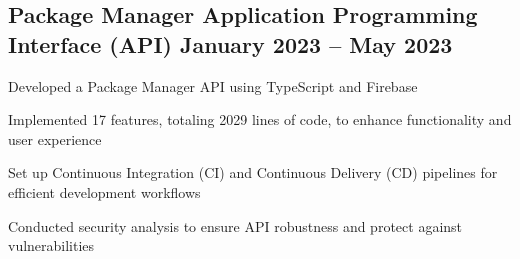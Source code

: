 \documentclass[letter,10pt]{article}
\begin{document}
\subsection{{Package Manager Application Programming Interface (API) \hfill January 2023 – May 2023}}
\begin{zitemize}
\item Developed a Package Manager API using TypeScript and Firebase
\item Implemented 17 features, totaling 2029 lines of code, to enhance functionality and user experience
\item Set up Continuous Integration (CI) and Continuous Delivery (CD) pipelines for efficient development workflows
\item Conducted security analysis to ensure API robustness and protect against vulnerabilities

\end{zitemize}
\end{document}
